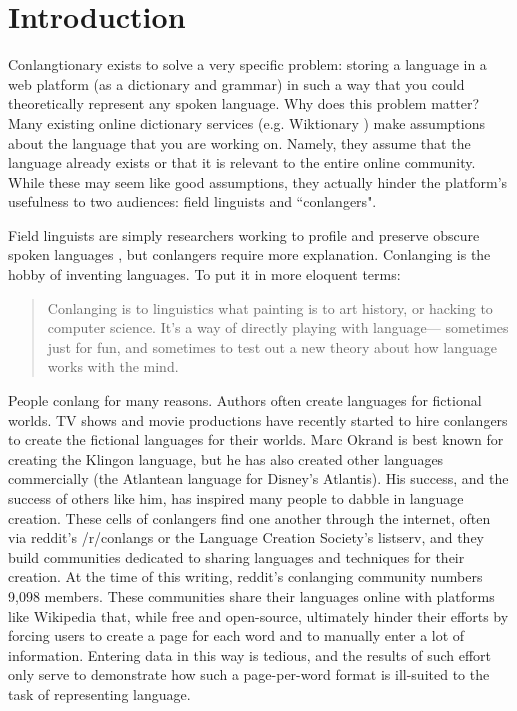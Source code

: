 \chapter{Introduction}
\label{chap:introduction}

Conlangtionary exists to solve a very specific problem: storing a language in a web platform (as a dictionary and grammar) in such a way that you could theoretically represent any spoken language. Why does this problem matter? Many existing online dictionary services (e.g. Wiktionary \cite{Wiktionary}) make assumptions about the language that you are working on. Namely, they assume that the language already exists or that it is relevant to the entire online community. While these may seem like good assumptions, they actually hinder the platform's usefulness to two audiences: field linguists and ``conlangers".

Field linguists are simply researchers working to profile and preserve obscure spoken languages \cite{Field-linguistics}, but conlangers require more explanation. Conlanging is the hobby of inventing languages. To put it in more eloquent terms:

\begin{quote}
Conlanging is to linguistics what painting is
to art history, or hacking to computer science.
It’s a way of directly playing with language—
sometimes just for fun, and sometimes to test
out a new theory about how language works
with the mind. \cite{Conlanging-101}
\end{quote}

People conlang for many reasons. Authors often create languages for fictional worlds. TV shows and movie productions have recently started to hire conlangers to create the fictional languages for their worlds. Marc Okrand is best known for creating the Klingon language, but he has also created other languages commercially (the Atlantean language for Disney's Atlantis). His success, and the success of others like him, has inspired many people to dabble in language creation. These cells of conlangers find one another through the internet, often via reddit's /r/conlangs or the Language Creation Society's listserv, and they build communities dedicated to sharing languages and techniques for their creation. At the time of this writing, reddit's conlanging community numbers 9,098 members. These communities share their languages online with platforms like Wikipedia that, while free and open-source, ultimately hinder their efforts by forcing users to create a page for each word and to manually enter a lot of information. Entering data in this way is tedious, and the results of such effort only serve to demonstrate how such a page-per-word format is ill-suited to the task of representing language.

